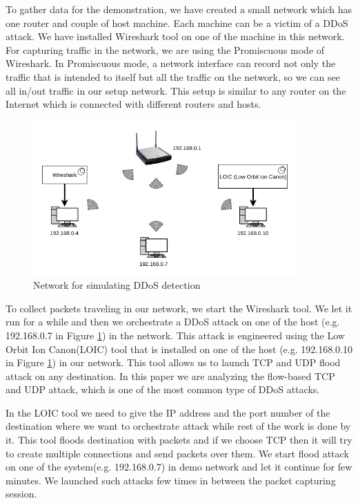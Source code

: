 \documentclass[12pt,oneside,a4paper]{article}
\begin{document}
To gather data for the demonstration, we have created a small network which has one router and couple of host machine. Each machine can be a victim of a DDoS attack. We have installed Wireshark tool on one of the machine in  this network. For capturing traffic in the network, we are using the Promiscuous mode of Wireshark. In Promiscuous mode, a network interface can record not only the traffic that is intended to itself but all the traffic on the network, so we can see all in/out traffic in our setup network. This setup is similar to any router on the Internet which is connected with different routers and hosts.

\begin{figure}[H]
\centering
\includegraphics[width=0.90\textwidth]{demo_network.png}
\caption{Network for simulating DDoS detection} \label{fig:demonetwork}
\end{figure}

To collect packets traveling in our network, we start the Wireshark tool. We let it run for a while and then we orchestrate a DDoS attack on one of the host (e.g. 192.168.0.7 in Figure \ref{fig:demonetwork}) in the network. This attack is engineered using the Low Orbit Ion Canon(LOIC) tool that is installed on one of the host (e.g. 192.168.0.10 in Figure \ref{fig:demonetwork}) in our network. This tool allows us to launch TCP and UDP flood attack on any destination. In this paper we are analyzing the flow-based TCP and UDP attack, which is one of the most common type of DDoS attacks.

In the LOIC tool we need to give the IP address and the port number of the destination where we want to orchestrate attack while rest of the work is done by it. This tool floods destination with packets and if we choose TCP then it will try to create multiple connections and send packets over them. We start flood attack on one of the system(e.g. 192.168.0.7) in demo network and let it continue for few minutes. We launched such attacks few times in between the packet capturing session.
\end{document}
